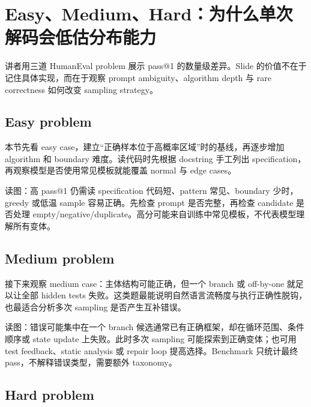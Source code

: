 \section{Easy、Medium、Hard：为什么单次解码会低估分布能力}

讲者用三道 HumanEval problem 展示 pass@1 的数量级差异。Slide 的价值不在于记住具体实现，而在于观察 prompt ambiguity、algorithm depth 与 rare correctness 如何改变 sampling strategy。

\subsection{Easy problem}

本节先看 easy case，建立“正确样本位于高概率区域”时的基线，再逐步增加 algorithm 和 boundary 难度。读代码时先根据 docstring 手工列出 specification，再观察模型是否使用常见模板就能覆盖 normal 与 edge cases。


\begin{knowledgebox}{读图：高 pass@1 仍需读 specification}
代码短、pattern 常见、boundary 少时，greedy 或低温 sample 容易正确。先检查 prompt 是否完整，再检查 candidate 是否处理 empty/negative/duplicate。高分可能来自训练中常见模板，不代表模型理解所有变体。
\end{knowledgebox}

\subsection{Medium problem}

接下来观察 medium case：主体结构可能正确，但一个 branch 或 off-by-one 就足以让全部 hidden tests 失败。这类题最能说明自然语言流畅度与执行正确性脱钩，也最适合分析多次 sampling 是否产生互补错误。


\begin{knowledgebox}{读图：错误可能集中在一个 branch}
候选通常已有正确框架，却在循环范围、条件顺序或 state update 上失败。此时多次 sampling 可能探索到正确变体；也可用 test feedback、static analysis 或 repair loop 提高选择。Benchmark 只统计最终 pass，不解释错误类型，需要额外 taxonomy。
\end{knowledgebox}

\subsection{Hard problem}

